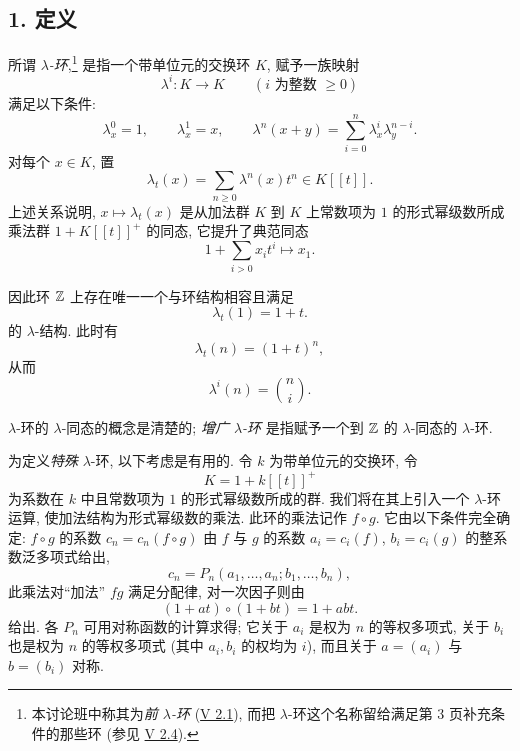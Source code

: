 \subsection*{1. 定义}

所谓 \emph{$\lambda$-环},\footnote{本讨论班中称其为\emph{前 $\lambda$-环} (\hyperlink{sga6.e05.def.2-1}{V 2.1}), 而把 $\lambda$-环这个名称留给满足第 3 页补充条件的那些环 (参见 \hyperlink{sga6.e05.def.2-4}{V 2.4}).} 是指一个带单位元的交换环 $K$, 赋予一族映射
\begin{equation}\tag{1.1}
\lambda^i:K\longrightarrow K\qquad (i\text{ 为整数 }\geq 0)
\end{equation}
满足以下条件:
\begin{equation}\tag{1.2}
\lambda_x^0=1,\qquad \lambda_x^1=x,\qquad
\lambda^n(x+y)=\sum_{i=0}^n \lambda^i_x\lambda^{n-i}_y .
\end{equation}
对每个 $x\in K$, 置
\begin{equation}\tag{1.3}
\lambda_t(x)=\sum_{n\geq 0}\lambda^n(x)t^n\in K[[t]].
\end{equation}
上述关系说明, $x\mapsto\lambda_t(x)$ 是从加法群 $K$ 到 $K$ 上常数项为 $1$ 的形式幂级数所成乘法群 $1+K[[t]]^+$ 的同态, 它提升了典范同态
\[
1+\sum_{i>0}x_it^i\longmapsto x_1.
\]

因此环 $\mathbb Z$ 上存在唯一一个与环结构相容且满足
\begin{equation}\tag{1.4}
\lambda_t(1)=1+t .
\end{equation}
的 $\lambda$-结构. 此时有
\begin{equation}\tag{1.5}
\lambda_t(n)=(1+t)^n,
\end{equation}
从而
\[
\lambda^i(n)=\binom{n}{i}.
\]

$\lambda$-环的 $\lambda$-同态的概念是清楚的; \emph{增广 $\lambda$-环} 是指赋予一个到 $\mathbb Z$ 的 $\lambda$-同态的 $\lambda$-环.

为定义\emph{特殊} $\lambda$-环, 以下考虑是有用的. 令 $k$ 为带单位元的交换环, 令
\[
K=1+k[[t]]^+
\]
为系数在 $k$ 中且常数项为 $1$ 的形式幂级数所成的群. 我们将在其上引入一个 $\lambda$-环运算, 使加法结构为形式幂级数的乘法. 此环的乘法记作 $f\circ g$. 它由以下条件完全确定: $f\circ g$ 的系数 $c_n=c_n(f\circ g)$ 由 $f$ 与 $g$ 的系数 $a_i=c_i(f)$, $b_i=c_i(g)$ 的整系数泛多项式给出,
\begin{equation}\tag{1.6}
c_n=P_n(a_1,\ldots,a_n;b_1,\ldots,b_n),
\end{equation}
此乘法对“加法” $fg$ 满足分配律, 对一次因子则由
\begin{equation}\tag{1.7}
(1+at)\circ(1+bt)=1+abt.
\end{equation}
给出. 各 $P_n$ 可用对称函数的计算求得; 它关于 $a_i$ 是权为 $n$ 的等权多项式, 关于 $b_i$ 也是权为 $n$ 的等权多项式 (其中 $a_i,b_i$ 的权均为 $i$), 而且关于 $a=(a_i)$ 与 $b=(b_i)$ 对称.

